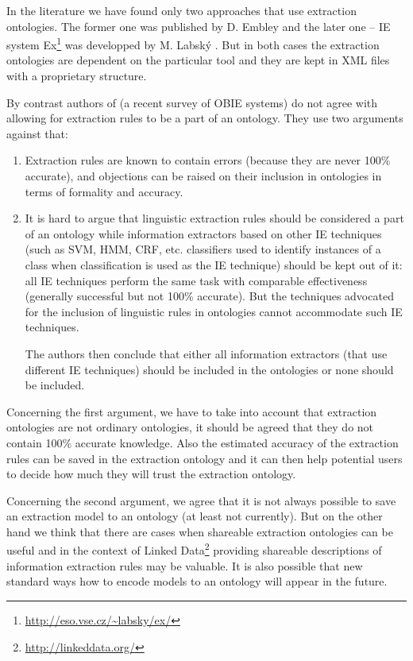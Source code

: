 In the literature we have found only two approaches that use extraction ontologies. The former one was published by D. Embley \citep{DBLP:conf/er/EmbleyTL02,Embley:2004:TSU:1012294.1012295}
and the later one -- IE system Ex\footnote{\url{http://eso.vse.cz/~labsky/ex/}} was developped by M. Labsk\'{y} \citep{springerlink:10.1007/978-3-642-01891-6_5}. 
But in both cases the extraction ontologies are dependent on the particular tool and they are kept in XML files with a proprietary structure.


By contrast authors of \citep{citeulike:7291004} (a recent survey of OBIE systems) do not agree with allowing for extraction rules to be a part of an ontology. They use two arguments against that:
\begin{enumerate}
	\item Extraction rules are known to contain errors (because they are never 100\% accurate), and objections can be raised on their inclusion in ontologies in terms of formality and accuracy.

	\item It is hard to argue that linguistic extraction rules should be considered a part of an ontology while information extractors based on other IE techniques (such as SVM, HMM, CRF, etc. classifiers used to identify instances of a class when classification is used as the IE technique) should be kept out of it: all IE techniques perform the same task with comparable effectiveness (generally successful but not 100\% accurate). But the techniques advocated for the inclusion of linguistic rules in ontologies cannot accommodate such IE techniques.
	
The authors then conclude that either all information extractors (that use different IE techniques) should be included in the ontologies or none should be included.
\end{enumerate}



Concerning the first argument, we have to take into account that extraction ontologies are not ordinary ontologies, it should be agreed that they do not contain 100\% accurate knowledge. Also the estimated accuracy of the extraction rules can be saved in the extraction ontology and it can then help potential users to decide how much they will trust the extraction ontology.

Concerning the second argument, we agree that it is not always possible to save an extraction model to an ontology (at least not currently). But on the other hand we think that there are cases when shareable extraction ontologies can be useful and in the context of Linked Data\footnote{\url{http://linkeddata.org/}} providing shareable descriptions of information extraction rules may be valuable. It is also possible that new standard ways how to encode models to an ontology will appear in the future.


